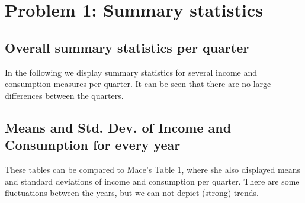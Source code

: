 \documentclass[12pt,a4paper]{article}
\begin{document}
\newpage


\section*{Problem 1: Summary statistics}

\subsection*{Overall summary statistics per quarter}

In the following we display summary statistics for several income and consumption measures per quarter. It can be seen that there are no large differences between the quarters.

\begin{center}




\end{center}

\subsection*{Means and Std. Dev. of Income and Consumption for every year}

These tables can be compared to Mace's Table 1, where she also displayed means and standard deviations of income and consumption per quarter. There are some fluctuations between the years, but we can not depict (strong) trends.

\begin{center}
\\
\\
\\
\\
\\
\\
\\
\\
\\
\\
\\
\\
\\
\\
\\
\end{center}
\end{document}
